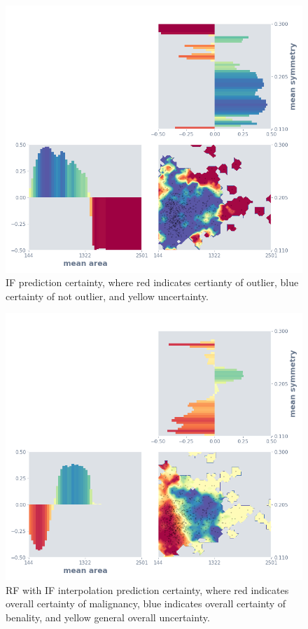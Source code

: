 \documentclass[a4paper, twocolumn]{article}
\begin{document}
\begin{figure}
\centering
\includegraphics[width=0.8\columnwidth]{img/interp_if.png}
\caption{IF prediction certainty, where red indicates certianty of outlier, blue certainty of not outlier, and yellow uncertainty.}
\label{fig:interp-if}
\end{figure}

\begin{figure}
\centering
\includegraphics[width=0.8\columnwidth]{img/interp_rf_if.png}
\caption{RF with IF interpolation prediction certainty, where red indicates overall certainty of malignancy, blue indicates overall certainty of benality, and yellow general overall uncertainty.}
\label{fig:interp-rf-if}
\end{figure}
\end{document}
